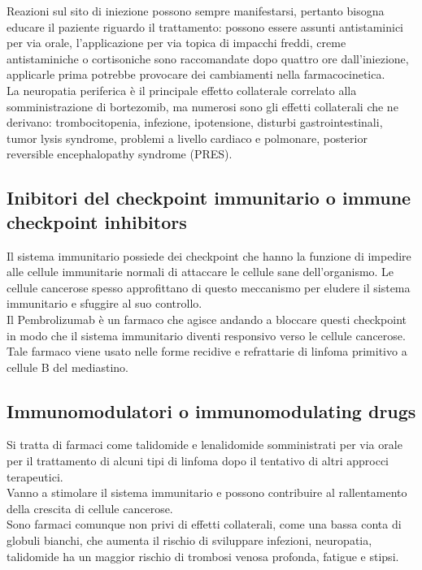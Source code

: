Reazioni sul sito di iniezione possono sempre manifestarsi, pertanto bisogna educare il paziente riguardo il 
trattamento: possono essere assunti antistaminici per via orale, l’applicazione per via topica di impacchi freddi, 
creme antistaminiche o cortisoniche sono raccomandate dopo quattro ore dall’iniezione, 
applicarle prima potrebbe provocare dei cambiamenti nella farmacocinetica\cite{BORTEZOMIB}.\\
La neuropatia periferica è il principale effetto collaterale correlato alla somministrazione di bortezomib, 
ma numerosi sono gli effetti collaterali che ne derivano: trombocitopenia, infezione, ipotensione, disturbi 
gastrointestinali, tumor lysis syndrome, problemi a livello cardiaco e polmonare, posterior reversible 
encephalopathy syndrome (PRES)\cite{BORTNURSES}.\\ 

\subsection{Inibitori del checkpoint immunitario o immune checkpoint inhibitors}

Il sistema immunitario possiede dei checkpoint che hanno la funzione di impedire alle cellule immunitarie normali di 
attaccare le cellule sane dell’organismo. Le cellule cancerose spesso approfittano di questo meccanismo per eludere il 
sistema immunitario e sfuggire al suo controllo.\\ 
Il Pembrolizumab è un farmaco che agisce andando a bloccare questi checkpoint in modo che il sistema immunitario 
diventi responsivo verso le cellule cancerose. Tale farmaco viene usato nelle forme recidive e refrattarie di linfoma 
primitivo a cellule B del mediastino\cite{IMMUNOTP}.\\

\subsection{Immunomodulatori o immunomodulating drugs}

Si tratta di farmaci come talidomide e lenalidomide somministrati per via orale per il trattamento di alcuni tipi di 
linfoma dopo il tentativo di altri approcci terapeutici\cite{MASSIVEBIO}.\\ 
Vanno a stimolare il sistema immunitario e possono contribuire al rallentamento della crescita di cellule cancerose.\\
Sono farmaci comunque non privi di effetti collaterali, come una bassa conta di globuli bianchi, che aumenta il 
rischio di sviluppare infezioni, neuropatia, talidomide ha un maggior rischio di trombosi venosa profonda, 
fatigue e stipsi\cite{IMMUNOTP}.\\

